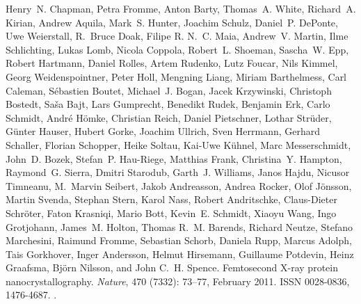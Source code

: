 \documentclass[a4paper]{article}
\begin{document}
\begin{thebibliography}{33}
Henry~N. Chapman, Petra Fromme, Anton Barty, Thomas~A. White, Richard~A.
  Kirian, Andrew Aquila, Mark~S. Hunter, Joachim Schulz, Daniel~P. DePonte, Uwe
  Weierstall, R.~Bruce Doak, Filipe R. N.~C. Maia, Andrew~V. Martin, Ilme
  Schlichting, Lukas Lomb, Nicola Coppola, Robert~L. Shoeman, Sascha~W. Epp,
  Robert Hartmann, Daniel Rolles, Artem Rudenko, Lutz Foucar, Nils Kimmel,
  Georg Weidenspointner, Peter Holl, Mengning Liang, Miriam Barthelmess, Carl
  Caleman, S{\'e}bastien Boutet, Michael~J. Bogan, Jacek Krzywinski, Christoph
  Bostedt, Sa{\v s}a Bajt, Lars Gumprecht, Benedikt Rudek, Benjamin Erk, Carlo
  Schmidt, Andr{\'e} H{\"o}mke, Christian Reich, Daniel Pietschner, Lothar
  Str{\"u}der, G{\"u}nter Hauser, Hubert Gorke, Joachim Ullrich, Sven Herrmann,
  Gerhard Schaller, Florian Schopper, Heike Soltau, Kai-Uwe K{\"u}hnel, Marc
  Messerschmidt, John~D. Bozek, Stefan~P. {Hau-Riege}, Matthias Frank,
  Christina~Y. Hampton, Raymond~G. Sierra, Dmitri Starodub, Garth~J. Williams,
  Janos Hajdu, Nicusor Timneanu, M.~Marvin Seibert, Jakob Andreasson, Andrea
  Rocker, Olof J{\"o}nsson, Martin Svenda, Stephan Stern, Karol Nass, Robert
  Andritschke, Claus-Dieter Schr{\"o}ter, Faton Krasniqi, Mario Bott, Kevin~E.
  Schmidt, Xiaoyu Wang, Ingo Grotjohann, James~M. Holton, Thomas R.~M. Barends,
  Richard Neutze, Stefano Marchesini, Raimund Fromme, Sebastian Schorb, Daniela
  Rupp, Marcus Adolph, Tais Gorkhover, Inger Andersson, Helmut Hirsemann,
  Guillaume Potdevin, Heinz Graafsma, Bj{\"o}rn Nilsson, and John C.~H. Spence.
\newblock Femtosecond {{X-ray}} protein nanocrystallography.
\newblock \emph{Nature}, 470 (7332): 73--77, February 2011.
\newblock ISSN 0028-0836, 1476-4687.
\newblock {}.


\end{thebibliography}
\end{document}
